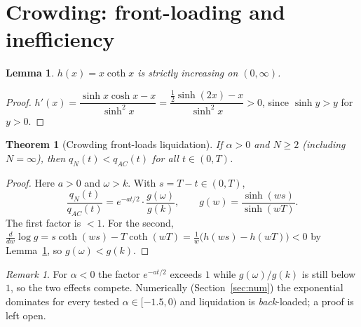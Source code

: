 \documentclass[11pt]{article}
\newtheorem{theorem}{Theorem}
\newtheorem{lemma}{Lemma}
\theoremstyle{definition}
\theoremstyle{remark}
\newtheorem{remark}{Remark}
\begin{document}
\section{Crowding: front-loading and inefficiency}
\begin{lemma}\label{lem:h}
$h(x)=x\coth x$ is strictly increasing on $(0,\infty)$.
\end{lemma}
\begin{proof}
$h'(x)=\dfrac{\sinh x\cosh x-x}{\sinh^2x}=\dfrac{\tfrac12\sinh(2x)-x}{\sinh^2x}>0$, since $\sinh y>y$ for $y>0$.
\end{proof}

\begin{theorem}[Crowding front-loads liquidation]\label{thm:front}
If $\alpha>0$ and $N\geq2$ (including $N=\infty$), then $q_N(t)<q_{AC}(t)$ for all $t\in(0,T)$.
\end{theorem}
\begin{proof}
Here $a>0$ and $\omega>k$. With $s=T-t\in(0,T)$,
\[
\frac{q_N(t)}{q_{AC}(t)} = e^{-at/2}\cdot\frac{g(\omega)}{g(k)},\qquad g(w)=\frac{\sinh(ws)}{\sinh(wT)}.
\]
The first factor is $<1$. For the second,
$\frac{d}{dw}\log g = s\coth(ws)-T\coth(wT)=\tfrac1w\big(h(ws)-h(wT)\big)<0$ by
Lemma~\ref{lem:h}, so $g(\omega)<g(k)$.
\end{proof}

\begin{remark}
For $\alpha<0$ the factor $e^{-at/2}$ exceeds $1$ while $g(\omega)/g(k)$ is still below $1$, so
the two effects compete. Numerically (Section~\ref{sec:num}) the exponential dominates for
every tested $\alpha\in[-1.5,0)$ and liquidation is \emph{back}-loaded; a proof is left open.
\end{remark}
\end{document}
